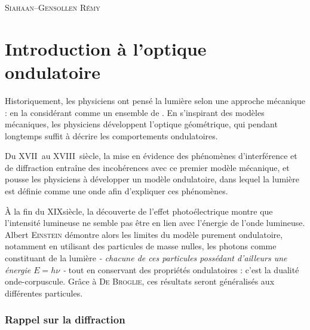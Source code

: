 \documentclass[a4paper,french,bookmarks]{book}
\newcommand{\chaptertoc}[0]{
    \setcounter{tocdepth}{2}
    \begin{tcolorbox}[
        enhanced,
        frame hidden,
        sharp corners,
        detach title,
        spread outwards     = 5pt,
        halign              = center,
        valign              = center,
        borderline west     = {3pt}{0pt}{main20!50!main2!95!gray!90},
        coltitle            = main20!50!main2!95!gray!90, 
        interior style      = {
            left color      = main1white2!65!gray!11,
            middle color    = main1white2!50!gray!10,
            right color     = main1white2!35!gray!9
        },
        arc                 = 0 cm,
        title               = SOMMAIRE,
        boxrule             = 0pt,
        fonttitle           = \bfseries\sffamily,
        overlay             = {
            \node[rotate=90, minimum width=1cm, anchor=south,yshift=-0.8cm]
            at (frame.west) {\tcbtitle};
        }
    ]
        \begin{minipage}{0.83\linewidth}
            \sffamily
            \minitoc
        \end{minipage}
    \end{tcolorbox}
}
\begin{document}
    \hfill{\large\textsc{Siahaan--Gensollen Rémy}}
    
    \pagestyle{intro}
    
    
    \newpage
    \dominitoc\nomtcrule 
    {\sffamily\tableofcontents}\mtcaddchapter\pagestyle{toc}
    
    \cleardoublepage
    
    
    \pagestyle{plain}
    
    \setcounter{chapter}{5}
    \chapter{Introduction à l'optique ondulatoire}
    
    Historiquement, les physiciens ont pensé la lumière selon une approche mécanique : en la considérant comme un ensemble de . En s'inspirant des modèles mécaniques, les physiciens développent l'optique géométrique, qui pendant longtemps suffit à décrire les comportements ondulatoires.\medskip
    
    Du \textsc{XVII}\ieme~au \textsc{XVIII}\ieme~siècle, la mise en évidence des phénomènes d'interférence et de diffraction entraîne des incohérences avec ce premier modèle mécanique, et pousse les physiciens à développer un modèle ondulatoire, dans lequel la lumière est définie comme une onde afin d'expliquer ces phénomènes.\medskip
    
    À la fin du \textsc{XIX}\ieme siècle, la découverte de l'effet photoélectrique montre que l'intensité lumineuse ne semble pas être en lien avec l'énergie de l'onde lumineuse. Albert \textsc{Einstein} démontre alors les limites du modèle purement ondulatoire, notamment en utilisant des particules de masse nulles, les photons comme constituant de la lumière \emph{- chacune de ces particules possédant d'ailleurs une énergie $E = h\nu$ -} tout en conservant des propriétés ondulatoires : c'est la dualité onde-corpuscule. Grâce à \textsc{De Broglie}, ces résultats seront généralisés aux différentes particules.
    
    \chaptertoc
    
    \subsection{Rappel sur la diffraction}
    
\end{document}
